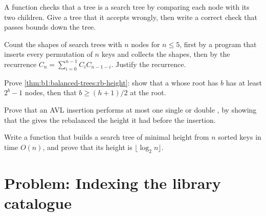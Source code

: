 \begin{exercise}[$\star\star$]\label{exo:b1:balanced-trees:8}
A function checks that a tree is a search tree by comparing each node with its two children. Give a tree that it
accepts wrongly, then write a correct check that passes bounds down the tree.
\end{exercise}

\begin{exercise}[$\star\star$]\label{exo:b1:balanced-trees:9}
Count the shapes of search trees with $n$ nodes for $n \leq 5$, first by a program that inserts every permutation of
$n$ keys and collects the shapes, then by the recurrence $C_n = \sum_{i=0}^{n-1} C_i C_{n-1-i}$. Justify the recurrence.
\end{exercise}

\begin{exercise}[$\star\star\star$]\label{exo:b1:balanced-trees:10}
Prove \cref{thm:b1:balanced-trees:rb-height}: show that a  whose root has  $b$ has at least $2^b - 1$
nodes, then that $b \geq (h + 1)/2$ at the root.
\end{exercise}

\begin{exercise}[$\star\star\star$]\label{exo:b1:balanced-trees:11}
Prove that an AVL insertion performs at most one single or double , by showing that the  gives the
rebalanced  the height it had before the insertion.
\end{exercise}

\begin{exercise}[$\star\star\star$]\label{exo:b1:balanced-trees:12}
Write a function that builds a search tree of minimal height from $n$ sorted keys in time $O(n)$, and prove that its
height is $\lfloor \log_2 n \rfloor$.
\end{exercise}

\section{Problem: Indexing the library catalogue}\label{sec:b1:balanced-trees:problem}

